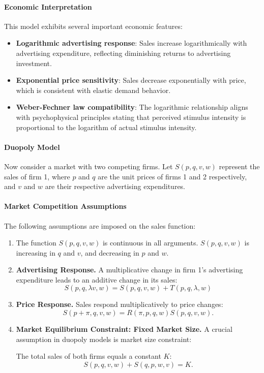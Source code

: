 \paragraph{Economic Interpretation}
This model exhibits several important economic features:
\begin{itemize}
\item \textbf{Logarithmic advertising response}: Sales increase logarithmically with advertising expenditure, reflecting diminishing returns to advertising investment.
\item \textbf{Exponential price sensitivity}: Sales decrease exponentially with price, which is consistent with elastic demand behavior.
\item \textbf{Weber-Fechner law compatibility}: The logarithmic relationship aligns with psychophysical principles stating that perceived stimulus intensity is proportional to the logarithm of actual stimulus intensity.
\end{itemize}

\paragraph{Duopoly Model}
Now consider a market with two competing firms. Let $S(p, q, v, w)$ represent the sales of firm 1, where $p$ and $q$ are the unit prices of firms 1 and 2 respectively, and $v$ and $w$ are their respective advertising expenditures.

\paragraph{Market Competition Assumptions}
The following assumptions are imposed on the sales function:
\begin{enumerate}
\item The function $S(p, q, v, w)$ is continuous in all arguments.
$S(p, q, v, w)$ is increasing in $q$ and $v$, and decreasing in $p$ and $w$.

\item {\bf Advertising Response.}
A multiplicative change in firm 1's advertising expenditure leads to an additive change in its sales:
\begin{equation}
S(p, q, \lambda v, w) = S(p, q, v, w) + T(p, q, \lambda, w)
\end{equation}

\item {\bf Price Response. }
Sales respond multiplicatively to price changes:
\begin{equation}
S(p+\pi, q, v, w) = R(\pi, p, q, w)S(p, q, v, w).
\end{equation}

\item {\bf Market Equilibrium Constraint: Fixed Market Size. } A crucial assumption in duopoly models is market size constraint:

The total sales of both firms equals a constant $K$:
\begin{equation}
S(p, q, v, w) + S(q, p, w, v) = K.
\end{equation}
\end{enumerate}


